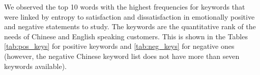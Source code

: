 \documentclass[smallextended,natbib]{svjour3}       %
\begin{document}
We observed the top 10 words with the highest frequencies for keywords that were linked by entropy to satisfaction and dissatisfaction in emotionally positive and negative statements to study. The keywords are the quantitative rank of the needs of Chinese and English speaking customers. This is shown in the Tables \ref{tab:pos_keys} for positive keywords and \ref{tab:neg_keys} for negative ones (however, the negative Chinese keyword list does not have more than seven keywords available).

\begin{table}[h]
\centering
\caption{Top 10 positive keywords in positive sentences}
\label{tab:pos_keys}
\end{table}
\end{document}
